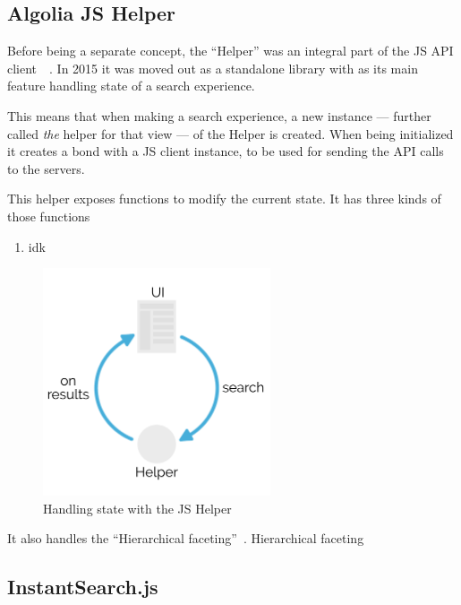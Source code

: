\subsection{Algolia JS Helper} %
\label{sub:algolia_js_helper}

Before being a separate concept, the ``Helper'' was an integral part of the JS API client~\cite{algolia-blog-js-client}~. In 2015 it was moved out as a standalone library with as its main feature handling state of a search experience.

This means that when making a search experience, a new instance --- further called \emph{the} helper for that view --- of the Helper is created. When being initialized it creates a bond with a JS client instance, to be used for sending the API calls to the servers.

This helper exposes functions to modify the current state. It has three kinds of those functions

\begin{enumerate}
  \item idk %
\end{enumerate}

\begin{figure}[H]
\label{figure:js-helper-state}
  \centering
  \includegraphics[width=0.6\textwidth]{../assets/helper-cycle.pdf}
  \caption{Handling state with the JS Helper\cite{js-helper-concepts}}
\end{figure}

It also handles the ``Hierarchical faceting''\cite{hierarchical-faceting}~. Hierarchical faceting %


\subsection{InstantSearch.js} %
\label{sub:instantsearch_js}

